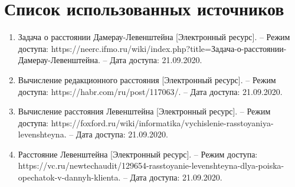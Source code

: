 \documentclass[12pt]{report}
\begin{document}
\chapter*{Список использованных источников}
\begin{enumerate}
	\item Задача о расстоянии Дамерау-Левенштейна [Электронный ресурс]. – Режим доступа: https://neerc.ifmo.ru/wiki/index.php?title=Задача-о-расстоянии-Дамерау-Левенштейна. – Дата доступа: 21.09.2020.
	\item Вычисление редакционного расстояния [Электронный ресурс]. – Режим доступа: https://habr.com/ru/post/117063/. – Дата доступа: 21.09.2020.
	\item Вычисление расстояния Левенштейна [Электронный ресурс]. – Режим доступа: https://foxford.ru/wiki/informatika/vychislenie-rasstoyaniya-levenshteyna. – Дата доступа: 21.09.2020.
	\item Расстояние Левенштейна [Электронный ресурс]. – Режим доступа: https://vc.ru/newtechaudit/129654-rasstoyanie-levenshteyna-dlya-poiska-opechatok-v-dannyh-klienta. – Дата доступа: 21.09.2020.
\end{enumerate}
\end{document}
